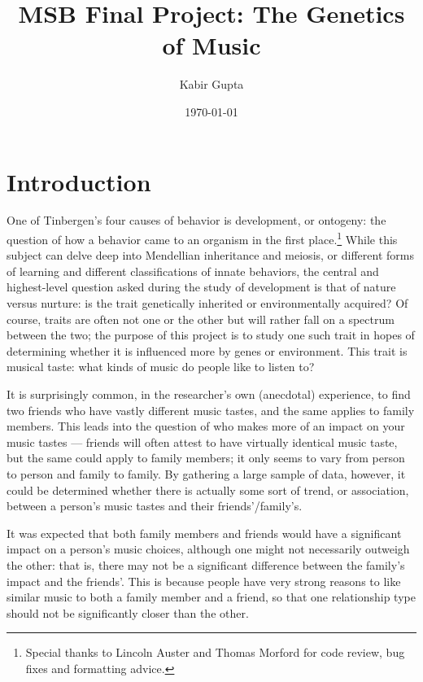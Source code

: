 \documentclass[12pt]{report}
\begin{document}
\title{MSB Final Project: The Genetics of Music}
\author{Kabir Gupta}
\date{\today}
\maketitle

\chapter*{Introduction}
One of Tinbergen's four causes of behavior is development, or ontogeny: the question of how a behavior came to an organism in the first place.\footnote{Special thanks to Lincoln Auster and Thomas Morford for code review, bug fixes and formatting advice.} While this subject can delve deep into Mendellian inheritance and meiosis, or different forms of learning and different classifications of innate behaviors, the central and highest-level question asked during the study of development is that of nature versus nurture: is the trait genetically inherited or environmentally acquired? Of course, traits are often not one or the other but will rather fall on a spectrum between the two; the purpose of this project is to study one such trait in hopes of determining whether it is influenced more by genes or environment. This trait is musical taste: what kinds of music do people like to listen to?

It is surprisingly common, in the researcher's own (anecdotal) experience, to find two friends who have vastly different music tastes, and the same applies to family members. This leads into the question of who makes more of an impact on your music tastes --- friends will often attest to have virtually identical music taste, but the same could apply to family members; it only seems to vary from person to person and family to family. By gathering a large sample of data, however, it could be determined whether there is actually some sort of trend, or association, between a person's music tastes and their friends'/family's.

It was expected that both family members and friends would have a significant impact on a person's music choices, although one might not necessarily outweigh the other: that is, there may not be a significant difference between the family's impact and the friends'. This is because people have very strong reasons to like similar music to both a family member and a friend, so that one relationship type should not be significantly closer than the other.
\end{document}
